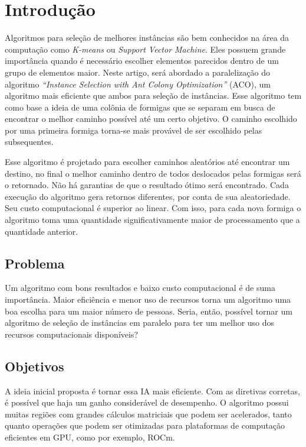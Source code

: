 \section{Introdução}
Algoritmos para seleção de melhores instâncias são bem conhecidos na área da computação como \emph{K-means} ou \emph{Support
Vector Machine}. Eles possuem grande importância quando é necessário escolher elementos parecidos dentro de um grupo de elementos
maior. Neste artigo, será abordado a paralelização do algoritmo \emph{``Instance Selection with Ant Colony Optimization''} (ACO),
um algoritmo mais eficiente que ambos para seleção de instâncias.
Esse algoritmo tem como base a ideia de uma colônia de formigas que se separam em busca de encontrar o melhor caminho
possível até um certo objetivo. O caminho escolhido por uma primeira formiga torna-se mais provável de ser escolhido
pelas subsequentes.

Esse algoritmo é projetado para escolher caminhos aleatórios até encontrar um destino, no final o melhor caminho dentro de todos deslocados pelas formigas
será o retornado. Não há garantias de que o resultado ótimo será encontrado. Cada execução do algoritmo gera retornos diferentes, por conta
de sua aleatoriedade. Seu custo computacional é superior ao linear. Com isso, para cada nova formiga o algoritmo toma uma quantidade
significativamente maior de processamento que a quantidade anterior.

\subsection{Problema}
Um algoritmo com bons resultados e baixo custo computacional é de suma importância. Maior eficiência e menor uso de recursos
torna um algoritmo uma boa escolha para um maior número de pessoas. Seria, então, possível tornar um algoritmo de seleção de
instâncias em paralelo para ter um melhor uso dos recursos computacionais disponíveis?


\subsection{Objetivos}

A ideia inicial proposta é tornar essa IA mais eficiente. Com as diretivas corretas, é possível que haja um ganho considerável de
desempenho. O algoritmo possui muitas regiões com grandes cálculos matriciais que podem ser acelerados, tanto quanto operações que
podem ser otimizadas para plataformas de computação eficientes em GPU, como por exemplo, {ROCm}.

